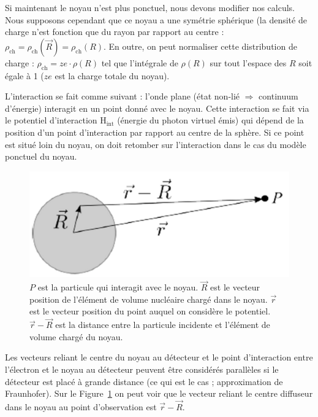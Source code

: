 Si maintenant le noyau n'est plus ponctuel, nous devons modifier nos calculs. Nous supposons cependant que ce noyau a une symétrie sphérique (la densité de charge n'est fonction que du rayon par rapport au centre : $\rho_\text{ch} = \rho_\text{ch}(\vec{R}) = \rho_\text{ch}(R)$. En outre, on peut normaliser cette distribution de charge : $\rho_\text{ch} = ze\cdot \rho(R)$ tel que l'intégrale de $\rho(R)$ sur tout l'espace des $R$ soit égale à 1 ($ze$ est la charge totale du noyau).

L'interaction se fait comme suivant : l'onde plane (état non-lié $\Rightarrow$ continuum d'énergie) interagit en un point donné avec le noyau. Cette interaction se fait via le potentiel d'interaction H$_\text{int}$ (énergie du photon virtuel émis) qui dépend de la position d'un point d'interaction par rapport au centre de la sphère. Si ce point est situé loin du noyau, on doit retomber sur l'interaction dans le cas du modèle ponctuel du noyau.

\begin{figure}[htpb]
    \centering
    \includegraphics[scale=0.2]{Images4/schema_interaction.png}
    \caption{$P$ est la particule qui interagit avec le noyau. $\vec{R}$ est le vecteur position de l'élément de volume nucléaire chargé dans le noyau. $\vec{r}$ est le vecteur position du point auquel on considère le potentiel. $\vec{r}-\vec{R}$ est la distance entre la particule incidente et l'élément de volume chargé du noyau.}
    \label{fig:schema_interaction}
\end{figure}

Les vecteurs reliant le centre du noyau au détecteur et le point d'interaction entre l'électron et le noyau au détecteur peuvent être considérés parallèles si le détecteur est placé à grande distance (ce qui est le cas ; approximation de Fraunhofer). Sur le Figure~\ref{fig:schema_interaction} on peut voir que le vecteur reliant le centre diffuseur dans le noyau au point d'observation est $\vec{r} - \vec{R}$.


